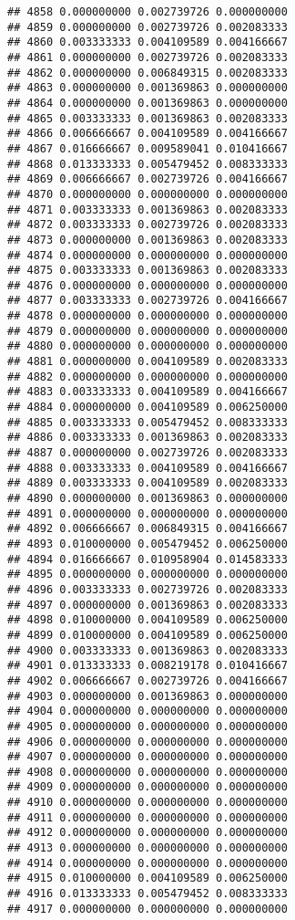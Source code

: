 \documentclass[
]{article}
\begin{document}
\begin{verbatim}
## 4858 0.000000000 0.002739726 0.000000000
## 4859 0.000000000 0.002739726 0.002083333
## 4860 0.003333333 0.004109589 0.004166667
## 4861 0.000000000 0.002739726 0.002083333
## 4862 0.000000000 0.006849315 0.002083333
## 4863 0.000000000 0.001369863 0.000000000
## 4864 0.000000000 0.001369863 0.000000000
## 4865 0.003333333 0.001369863 0.002083333
## 4866 0.006666667 0.004109589 0.004166667
## 4867 0.016666667 0.009589041 0.010416667
## 4868 0.013333333 0.005479452 0.008333333
## 4869 0.006666667 0.002739726 0.004166667
## 4870 0.000000000 0.000000000 0.000000000
## 4871 0.003333333 0.001369863 0.002083333
## 4872 0.003333333 0.002739726 0.002083333
## 4873 0.000000000 0.001369863 0.002083333
## 4874 0.000000000 0.000000000 0.000000000
## 4875 0.003333333 0.001369863 0.002083333
## 4876 0.000000000 0.000000000 0.000000000
## 4877 0.003333333 0.002739726 0.004166667
## 4878 0.000000000 0.000000000 0.000000000
## 4879 0.000000000 0.000000000 0.000000000
## 4880 0.000000000 0.000000000 0.000000000
## 4881 0.000000000 0.004109589 0.002083333
## 4882 0.000000000 0.000000000 0.000000000
## 4883 0.003333333 0.004109589 0.004166667
## 4884 0.000000000 0.004109589 0.006250000
## 4885 0.003333333 0.005479452 0.008333333
## 4886 0.003333333 0.001369863 0.002083333
## 4887 0.000000000 0.002739726 0.002083333
## 4888 0.003333333 0.004109589 0.004166667
## 4889 0.003333333 0.004109589 0.002083333
## 4890 0.000000000 0.001369863 0.000000000
## 4891 0.000000000 0.000000000 0.000000000
## 4892 0.006666667 0.006849315 0.004166667
## 4893 0.010000000 0.005479452 0.006250000
## 4894 0.016666667 0.010958904 0.014583333
## 4895 0.000000000 0.000000000 0.000000000
## 4896 0.003333333 0.002739726 0.002083333
## 4897 0.000000000 0.001369863 0.002083333
## 4898 0.010000000 0.004109589 0.006250000
## 4899 0.010000000 0.004109589 0.006250000
## 4900 0.003333333 0.001369863 0.002083333
## 4901 0.013333333 0.008219178 0.010416667
## 4902 0.006666667 0.002739726 0.004166667
## 4903 0.000000000 0.001369863 0.000000000
## 4904 0.000000000 0.000000000 0.000000000
## 4905 0.000000000 0.000000000 0.000000000
## 4906 0.000000000 0.000000000 0.000000000
## 4907 0.000000000 0.000000000 0.000000000
## 4908 0.000000000 0.000000000 0.000000000
## 4909 0.000000000 0.000000000 0.000000000
## 4910 0.000000000 0.000000000 0.000000000
## 4911 0.000000000 0.000000000 0.000000000
## 4912 0.000000000 0.000000000 0.000000000
## 4913 0.000000000 0.000000000 0.000000000
## 4914 0.000000000 0.000000000 0.000000000
## 4915 0.010000000 0.004109589 0.006250000
## 4916 0.013333333 0.005479452 0.008333333
## 4917 0.000000000 0.000000000 0.000000000

\end{verbatim}
\end{document}
